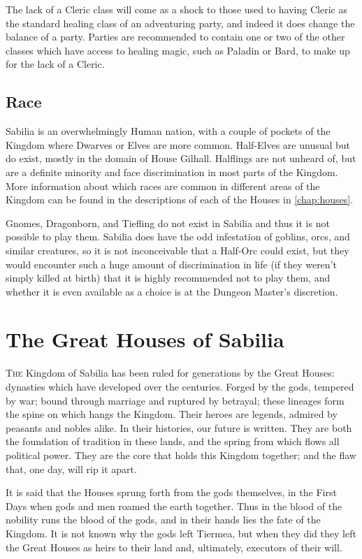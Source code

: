 \documentclass[10pt,twoside,openright,a4paper,twocolumn]{book}
\begin{document}
\noindent
The lack of a Cleric class will come as a shock to those used to having Cleric
as the standard healing class of an adventuring party, and indeed it does
change the balance of a party.  Parties are recommended to contain one or two
of the other classes which have access to healing magic, such as Paladin or
Bard, to make up for the lack of a Cleric.

\section{Race}

Sabilia is an overwhelmingly Human nation, with a couple of pockets of the
Kingdom where Dwarves or Elves are more common.  Half-Elves are unusual but do
exist, mostly in the domain of House Gilhall.  Halflings are not unheard of,
but are a definite minority and face discrimination in most parts of the
Kingdom.  More information about which races are common in different areas of
the Kingdom can be found in the descriptions of each of the Houses in
\autoref{chap:houses}.

Gnomes, Dragonborn, and Tiefling do not exist in Sabilia and thus it is not
possible to play them.  Sabilia does have the odd infestation of goblins, orcs,
and similar creatures, so it is not inconceivable that a Half-Orc could exist,
but they would encounter such a huge amount of discrimination in life (if they
weren't simply killed at birth) that it is highly recommended not to play them,
and whether it is even available as a choice is at the Dungeon Master's
discretion.

\chapter{The Great Houses of Sabilia}
\label{chap:houses}

\lettrine{T}{he} Kingdom of Sabilia has been ruled for generations by the Great
Houses: dynasties which have developed over the centuries.  Forged by the gods,
tempered by war; bound through marriage and ruptured by betrayal; these
lineages form the spine on which hangs the Kingdom.  Their heroes are legends,
admired by peasants and nobles alike.  In their histories, our future is
written.  They are both the foundation of tradition in these lands, and the
spring from which flows all political power.  They are the core that holds this
Kingdom together; and the flaw that, one day, will rip it apart.

It is said that the Houses sprung forth from the gods themselves, in the First
Days when gods and men roamed the earth together.  Thus in the blood of the
nobility runs the blood of the gods, and in their hands lies the fate of the
Kingdom.  It is not known why the gods left Tiermea, but when they did they
left the Great Houses as heirs to their land and, ultimately, executors of
their will.
\end{document}
